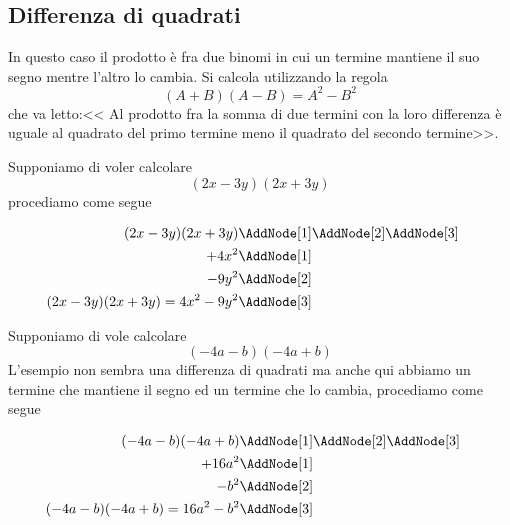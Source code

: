 \subsection{Differenza di quadrati}
In questo caso il prodotto è fra due binomi in cui un termine mantiene il suo segno mentre l'altro lo cambia. Si calcola utilizzando la regola \[(A+B)(A-B)=A^2-B^2 \] che va letto:<< Al prodotto fra la somma di due termini con la loro differenza è uguale al quadrato del primo termine meno il quadrato del secondo termine>>.
\begin{center}

\end{center}
\begin{esempio}
Supponiamo di voler calcolare \[(2x-3y)(2x+3y)\]
procediamo come segue
\begin{NodesList}
	\begin{align*}
		(2x-3y)(2x+3y)&\AddNode[1]\AddNode[2]\AddNode[3]\\
		+4x^2&\AddNode[1]&\\ 
		-9y^2&\AddNode[2]&\\
		(2x-3y)(2x+3y)=4x^2-9y^2&\AddNode[3]
	\end{align*}
\end{NodesList}
\end{esempio}
\begin{esempio}
Supponiamo di vole calcolare \[(-4a-b)(-4a+b)\]
L'esempio non sembra una differenza di quadrati ma anche qui abbiamo un termine che mantiene il segno ed un termine che lo cambia, procediamo come segue
\begin{NodesList}
	\begin{align*}
		(-4a-b)(-4a+b)&\AddNode[1]\AddNode[2]\AddNode[3]\\
		+16a^2&\AddNode[1]&\\ 
		-b^2&\AddNode[2]&\\
		(-4a-b)(-4a+b)=16a^2-b^2&\AddNode[3]
	\end{align*}
\end{NodesList}
\end{esempio}
